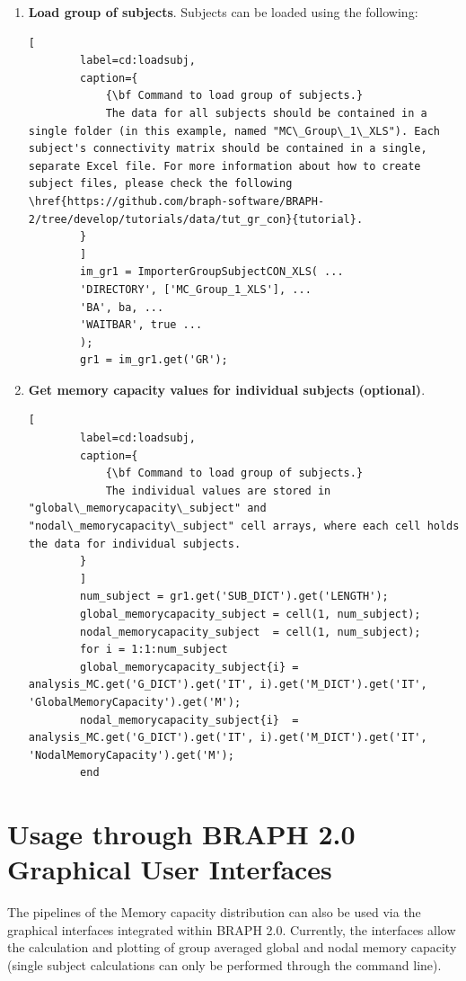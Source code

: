 \documentclass[justified]{tufte-handout}
\begin{document}
\begin{enumerate}
	
	\item {\bf  Load group of subjects}. Subjects can be loaded using the following:
		\begin{lstlisting}[
		label=cd:loadsubj,
		caption={
			{\bf Command to load group of subjects.}
			The data for all subjects should be contained in a single folder (in this example, named "MC\_Group\_1\_XLS"). Each subject's connectivity matrix should be contained in a single, separate Excel file. For more information about how to create subject files, please check the following \href{https://github.com/braph-software/BRAPH-2/tree/develop/tutorials/data/tut_gr_con}{tutorial}.
		}
		]
		im_gr1 = ImporterGroupSubjectCON_XLS( ...
		'DIRECTORY', ['MC_Group_1_XLS'], ...
		'BA', ba, ...
		'WAITBAR', true ...
		);
		gr1 = im_gr1.get('GR');
	\end{lstlisting}
	
	\item {\bf  Get memory capacity values for individual subjects (optional)}.
			\begin{lstlisting}[
		label=cd:loadsubj,
		caption={
			{\bf Command to load group of subjects.}
			The individual values are stored in "global\_memorycapacity\_subject" and "nodal\_memorycapacity\_subject" cell arrays, where each cell holds the data for individual subjects.
		}
		]
		num_subject = gr1.get('SUB_DICT').get('LENGTH');
		global_memorycapacity_subject = cell(1, num_subject);
		nodal_memorycapacity_subject  = cell(1, num_subject);
		for i = 1:1:num_subject
		global_memorycapacity_subject{i} = analysis_MC.get('G_DICT').get('IT', i).get('M_DICT').get('IT', 'GlobalMemoryCapacity').get('M');
		nodal_memorycapacity_subject{i}  = analysis_MC.get('G_DICT').get('IT', i).get('M_DICT').get('IT', 'NodalMemoryCapacity').get('M');
		end
	\end{lstlisting}
	
\end{enumerate}

\section{Usage through BRAPH 2.0 Graphical User Interfaces}

The pipelines of the Memory capacity distribution can also be used via the graphical interfaces integrated within BRAPH 2.0. Currently, the interfaces allow the calculation and plotting of group averaged global and nodal memory capacity (single subject calculations can only be performed through the command line).
\end{document}
